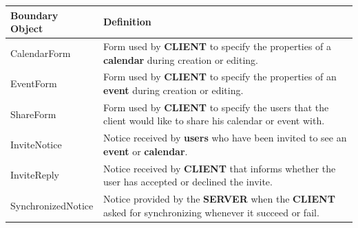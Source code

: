 \newpage
\begin{tabular}{|l|p{10cm}|}
\hline
\textbf{Boundary Object} & \textbf{Definition} \\ \hline
CalendarForm & Form used by \textbf{CLIENT} to specify the properties of a \textbf{calendar} during creation or editing. \\ \hline
EventForm & Form used by \textbf{CLIENT} to specify the properties of an \textbf{event} during creation or editing. \\ \hline
ShareForm & Form used by \textbf{CLIENT} to specify the users that the client would like to share his calendar or event with. \\ \hline
InviteNotice & Notice received by \textbf{users} who have been invited to see an \textbf{event} or \textbf{calendar}. \\ \hline
InviteReply & Notice received by \textbf{CLIENT} that informs whether the user has accepted or declined the invite.   \\ \hline
SynchronizedNotice & Notice provided by the \textbf{SERVER} when the \textbf{CLIENT} asked for synchronizing whenever it succeed or fail.  \\ \hline
\end{tabular}


